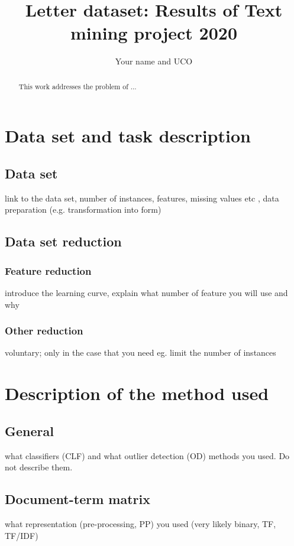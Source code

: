 \documentclass[12pt]{llncs} %
\begin{document}
\title{Letter dataset: Results of Text mining project 2020}
\date{}

\author{Your name and UCO}
\maketitle

\begin{abstract}
This work addresses the problem of ...

\end{abstract}

\section{Data set and task description}

\subsection{Data set}
link to the data set, number of instances, features, missing values etc , data preparation (e.g. transformation into form)

\subsection{Data set reduction}

\subsubsection{Feature reduction}
introduce the learning curve, explain what number of feature you will use and why

\subsubsection{Other reduction}
voluntary; only in the case that you need eg. limit the number of instances

\section{Description of the method used}
\subsection{General}
what classifiers (CLF) and what outlier detection (OD) methods you used.
Do not describe them.

\subsection{Document-term matrix}
what representation (pre-processing, PP) you used (very likely binary, TF, TF/IDF)
\end{document}
